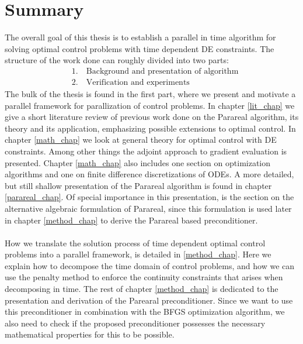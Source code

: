 \section{Summary}
The overall goal of this thesis is to establish a parallel in time algorithm for solving optimal control problems with time dependent DE constraints. The structure of the work done can roughly divided into two parts:
\begin{align*}
&1.\quad \textrm{Background and presentation of algorithm} \\
&2.\quad \textrm{Verification and experiments}
\end{align*}
The bulk of the thesis is found in the first part, where we present and motivate a parallel framework for parallization of control problems. In chapter \ref{lit_chap} we give a short literature review of previous work done on the Parareal algorithm, its theory and its application, emphasizing possible extensions to optimal control. In chapter \ref{math_chap} we look at general theory for optimal control with DE constraints. Among other things the adjoint approach to gradient evaluation is presented. Chapter \ref{math_chap} also includes one section on optimization algorithms and one on finite difference discretizations of ODEs. A more detailed, but still shallow presentation of the Parareal algorithm is found in chapter \ref{parareal_chap}. Of special importance in this presentation, is the section on the alternative algebraic formulation of Parareal, since this formulation is used later in chapter \ref{method_chap} to derive the Parareal based preconditioner.
\\
\\
How we translate the solution process of time dependent optimal control problems into a parallel framework, is detailed in \ref{method_chap}. Here we explain how to decompose the time domain of control problems, and how we can use the penalty method to enforce the continuity constraints that arises when decomposing in time. The rest of chapter \ref{method_chap} is dedicated to the presentation and derivation of the Parearal preconditioner. Since we want to use this preconditioner in combination with the BFGS optimization algorithm, we also need to check if the proposed preconditioner possesses the necessary mathematical properties for this to be possible. 
\\
\\
